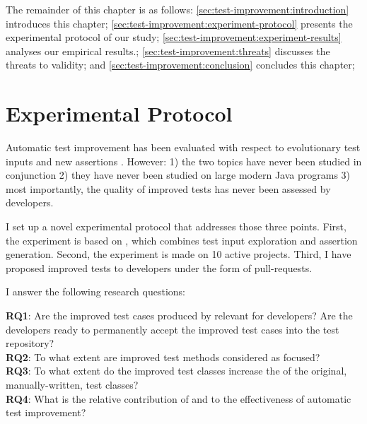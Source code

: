 The remainder of this chapter is as follows:
\autoref{sec:test-improvement:introduction} introduces this chapter;
\autoref{sec:test-improvement:experiment-protocol} presents the experimental protocol of our study;
\autoref{sec:test-improvement:experiment-results} analyses our empirical results.;
\autoref{sec:test-improvement:threats} discusses the threats to validity;
and \autoref{sec:test-improvement:conclusion} concludes this chapter;

\section{Experimental  Protocol}
\label{sec:test-improvement:experiment-protocol}

Automatic test improvement has been evaluated with respect to evolutionary test inputs \cite{tonella} and new assertions \cite{TaoXie2006}.
However:
1) the two topics have never been studied in conjunction
2) they have never been studied on large modern Java programs
3) most importantly, the quality of improved tests has never been assessed by developers.

I set up a novel experimental protocol that addresses those three points.
First, the experiment is based on \dspot, which combines test input exploration and assertion generation.
Second, the experiment is made on 10 active \gh projects.
Third, I have proposed improved tests to developers under the form of pull-requests.

I answer the following research questions:

\newcommand\rqpullrequest{RQ1\xspace}
\newcommand\rqcandidates{RQ2\xspace}
\newcommand\rqeffectiveness{RQ3\xspace}
\newcommand\rqAmplVersusIAmpl{RQ4\xspace}

\noindent\textbf{\rqpullrequest}: Are the improved test cases produced by \dspot relevant for developers? Are the developers ready to permanently accept the improved test cases into the test repository?\\
\textbf{\rqcandidates}: To what extent are improved test methods considered as focused?\\
\textbf{\rqeffectiveness}: To what extent do the improved test classes increase the \ms of the original,  manually-written, test classes?\\
\textbf{\rqAmplVersusIAmpl}: What is the relative contribution of \Iampl{} and \Aampl{} to the effectiveness of automatic test improvement?\\

